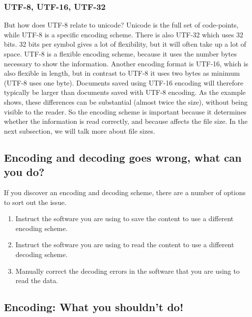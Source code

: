 \documentclass[]{book}
\providecommand{\tightlist}{%
  \setlength{\itemsep}{0pt}\setlength{\parskip}{0pt}}
\begin{document}
\hypertarget{utf-8-utf-16-utf-32}{%
\subsubsection{UTF-8, UTF-16, UTF-32}\label{utf-8-utf-16-utf-32}}

But how does UTF-8 relate to unicode? Unicode is the full set of code-points, while UTF-8 is a specific encoding scheme. There is also UTF-32 which uses 32 bits. 32 bits per symbol gives a lot of flexibility, but it will often take up a lot of space. UTF-8 is a flexible encoding scheme, because it uses the number bytes necessary to show the information. Another encoding format is UTF-16, which is also flexible in length, but in contrast to UTF-8 it uses two bytes as minimum (UTF-8 uses one byte). Documents saved using UTF-16 encoding will therefore typically be larger than documents saved with UTF-8 encoding. As the example shows, these differences can be substantial (almost twice the size), without being visible to the reader. So the encoding scheme is important because it determines whether the information is read correctly, and because affects the file size. In the next subsection, we will talk more about file sizes.

\hypertarget{encoding-and-decoding-goes-wrong-what-can-you-do}{%
\subsection{Encoding and decoding goes wrong, what can you do?}\label{encoding-and-decoding-goes-wrong-what-can-you-do}}

If you discover an encoding and decoding scheme, there are a number of options to sort out the issue.

\begin{enumerate}
\def\labelenumi{\arabic{enumi}.}
\tightlist
\item
  Instruct the software you are using to save the content to use a different encoding scheme.
\item
  Instruct the software you are using to read the content to use a different decoding scheme.
\item
  Manually correct the decoding errors in the software that you are using to read the data.
\end{enumerate}

\hypertarget{encoding-what-you-shouldnt-do}{%
\subsection{Encoding: What you shouldn't do!}\label{encoding-what-you-shouldnt-do}}
\end{document}
